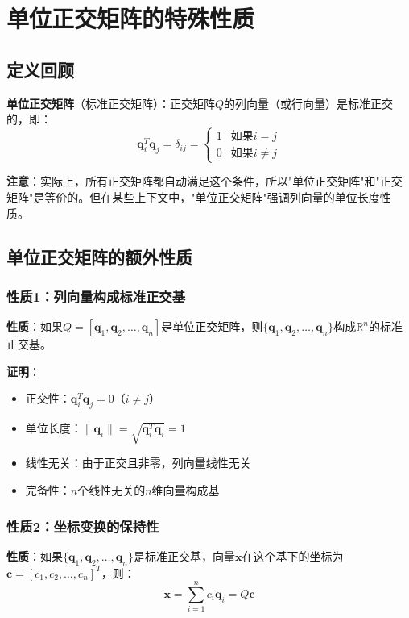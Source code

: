 \documentclass[12pt,a4paper]{article}
\begin{document}
\section{单位正交矩阵的特殊性质}

\subsection{定义回顾}

\textbf{单位正交矩阵}（标准正交矩阵）：正交矩阵$Q$的列向量（或行向量）是标准正交的，即：
\begin{equation}
\bm{q}_i^T \bm{q}_j = \delta_{ij} = \begin{cases} 1 & \text{如果} i = j \\ 0 & \text{如果} i \neq j \end{cases}
\end{equation}

\textbf{注意}：实际上，所有正交矩阵都自动满足这个条件，所以"单位正交矩阵"和"正交矩阵"是等价的。但在某些上下文中，"单位正交矩阵"强调列向量的单位长度性质。

\subsection{单位正交矩阵的额外性质}

\subsubsection{性质1：列向量构成标准正交基}

\textbf{性质}：如果$Q = [\bm{q}_1, \bm{q}_2, \ldots, \bm{q}_n]$是单位正交矩阵，则$\{\bm{q}_1, \bm{q}_2, \ldots, \bm{q}_n\}$构成$\mathbb{R}^n$的标准正交基。

\textbf{证明}：
\begin{itemize}
\item 正交性：$\bm{q}_i^T \bm{q}_j = 0$（$i \neq j$）
\item 单位长度：$\|\bm{q}_i\| = \sqrt{\bm{q}_i^T \bm{q}_i} = 1$
\item 线性无关：由于正交且非零，列向量线性无关
\item 完备性：$n$个线性无关的$n$维向量构成基
\end{itemize}

\subsubsection{性质2：坐标变换的保持性}

\textbf{性质}：如果$\{\bm{q}_1, \bm{q}_2, \ldots, \bm{q}_n\}$是标准正交基，向量$\bm{x}$在这个基下的坐标为$\bm{c} = [c_1, c_2, \ldots, c_n]^T$，则：
\begin{equation}
\bm{x} = \sum_{i=1}^n c_i \bm{q}_i = Q\bm{c}
\end{equation}
\end{document}
